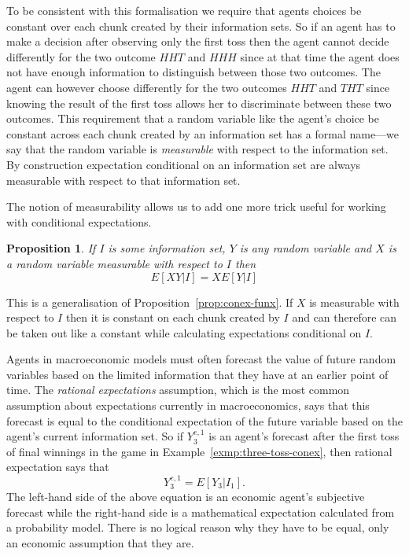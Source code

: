\documentclass[12pt,reqno,openany]{amsbook}
\theoremstyle{plain}
\newtheorem{prop}{Proposition}[chapter]
\theoremstyle{definition}
\newcommand{\newterm}[1]{\emph{#1}}
\begin{document}
To be consistent with this formalisation we require that agents
choices be constant over each chunk created by their information sets.
So if an agent has to make a decision after observing only the first
toss then the agent cannot decide differently for the two outcome
$HHT$ and $HHH$ since at that time the agent does not have enough
information to distinguish between those two outcomes. The agent can
however choose differently for the two outcomes $HHT$ and $THT$ since
knowing the result of the first toss allows her to discriminate
between these two outcomes. This requirement that a random variable
like the agent's choice be constant across each chunk created by an
information set has a formal name---we say that the random variable is
\newterm{measurable} with respect to the information set. By
construction expectation conditional on an information set are always
measurable with respect to that information set.

The notion of measurability allows us to add one more trick useful for
working with conditional expectations. 

\begin{prop}\label{prop:conex-measure}
If $I$ is some information set,
$Y$ is any random variable and $X$ is a random variable measurable
with respect to $I$ then
\[E[XY|I]=XE[Y|I]\]
\end{prop}
This is a generalisation of Proposition~\ref{prop:conex-funx}. If $X$
is measurable with respect to $I$ then it is constant on each chunk
created by $I$ and can therefore can be taken out like a constant
while calculating expectations conditional on $I$.

Agents in macroeconomic models must often forecast the value of future
random variables based on the limited information that they have at an
earlier point of time. The \newterm{rational expectations} assumption,
which is the most common assumption about expectations currently in
macroeconomics, says that this forecast is equal to the conditional
expectation of the future variable based on the agent's current
information set. So if $Y_3^{e,1}$ is an agent's forecast after the
first toss of final
winnings in the game in Example~\ref{exmp:three-toss-conex},
then rational expectation says that
\[Y_3^{e,1}=E[Y_3|I_1].\]
The left-hand side of the above equation is an economic agent's
subjective forecast while the right-hand side is a mathematical
expectation calculated from a probability model. There is no logical
reason why they have to be equal, only an economic assumption that
they are.
\end{document}
